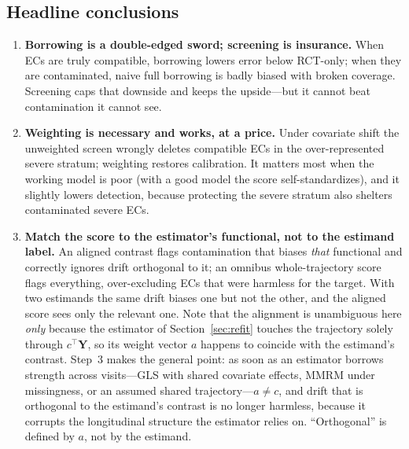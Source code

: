 \documentclass[11pt]{article}
\begin{document}
\subsection{Headline conclusions}

\begin{enumerate}
    \item \textbf{Borrowing is a double-edged sword; screening is insurance.} When ECs are truly compatible, borrowing lowers error below RCT-only; when they are contaminated, naive full borrowing is badly biased with broken coverage. Screening caps that downside and keeps the upside---but it cannot beat contamination it cannot see.
    \item \textbf{Weighting is necessary and works, at a price.} Under covariate shift the unweighted screen wrongly deletes compatible ECs in the over-represented severe stratum; weighting restores calibration. It matters most when the working model is poor (with a good model the score self-standardizes), and it slightly lowers detection, because protecting the severe stratum also shelters contaminated severe ECs.
    \item \textbf{Match the score to the estimator's functional, not to the estimand label.} An aligned contrast flags contamination that biases \emph{that} functional and correctly ignores drift orthogonal to it; an omnibus whole-trajectory score flags everything, over-excluding ECs that were harmless for the target. With two estimands the same drift biases one but not the other, and the aligned score sees only the relevant one. Note that the alignment is unambiguous here \emph{only} because the estimator of Section~\ref{sec:refit} touches the trajectory solely through $c^{\top}\bm Y$, so its weight vector $a$ happens to coincide with the estimand's contrast. Step~3 makes the general point: as soon as an estimator borrows strength across visits---GLS with shared covariate effects, MMRM under missingness, or an assumed shared trajectory---$a\neq c$, and drift that is orthogonal to the estimand's contrast is no longer harmless, because it corrupts the longitudinal structure the estimator relies on. ``Orthogonal'' is defined by $a$, not by the estimand.

\end{enumerate}
\end{document}
